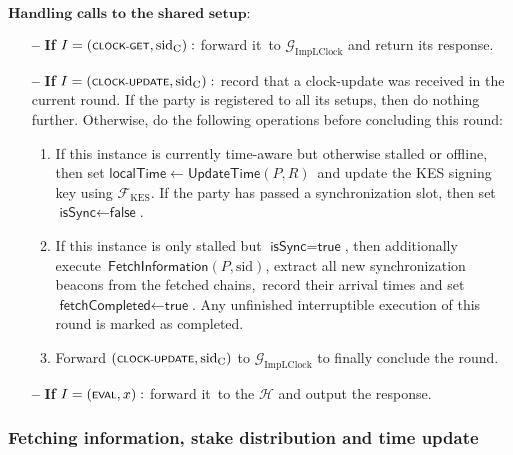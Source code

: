 \begin{protocol}
\begin{algorithmic}
        \State $\textbf{Handling calls to the shared setup:}$
        \begin{itemize}
            \item[\textbf{--}] \textbf{If} $I = (\textsf{\scriptsize{CLOCK-GET}}, \text{sid}_\text{C}):$ forward it\
            to $\mathcal{G}_{\text{ImpLClock}}$ and return its response.
            \item[\textbf{--}] \textbf{If} $I = (\textsf{\scriptsize{CLOCK-UPDATE}}, \text{sid}_\text{C}):$ record that a clock-update was received in the current round.
            If the party is registered to all its setups,  then do nothing further.
            Otherwise,  do the following operations before concluding this round:
            \begin{enumerate}
                \item If this instance is currently time-aware but otherwise stalled or offline, then set $\textsf{localTime} \leftarrow \textsf{UpdateTime}(P, R)$\
                and update the KES signing key using $\mathcal{F}_{\text{KES}}$.
                If the party has passed a synchronization slot, then set $\textsf{isSync}  \leftarrow  \textsf{false}$.
                \item If this instance is only stalled but $\textsf{isSync}  =  \textsf{true}$, then additionally execute\
                \hyperref[apndx:fetch-info-protocol]{$\textsf{FetchInformation}$}$(P, \text{sid})$, extract all new synchronization beacons from the fetched chains,\
                record their arrival times and set $\textsf{fetchCompleted}  \leftarrow  \textsf{true}$.
                Any unfinished interruptible execution of this round is marked as completed.
                \item Forward $(\textsf{\scriptsize{CLOCK-UPDATE}}, \text{sid}_\text{C})$ to $\mathcal{G}_{\text{ImpLClock}}$ to finally conclude the round.
            \end{enumerate}
            \item[\textbf{--}] \textbf{If} $I = (\textsf{\scriptsize{EVAL}}, x):$ forward it\
            to the $\mathcal{H}$ and output the response.
        \end{itemize}


    \end{algorithmic}\label{alg:spectrum-protocol}
\end{protocol}

\subsubsection{Fetching information, stake distribution and time update}


